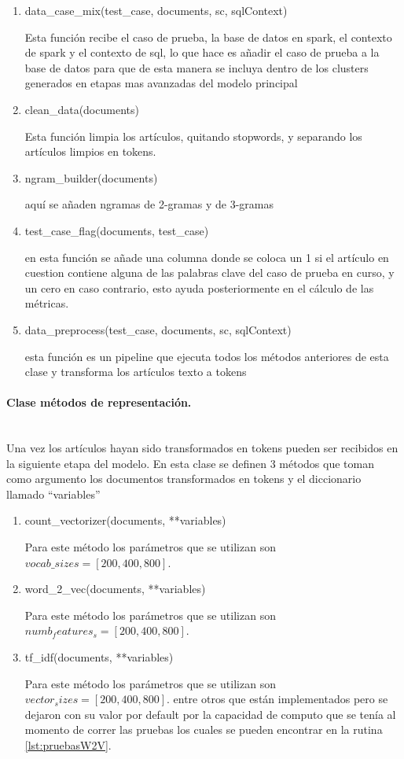 \documentclass[12pt]{article}
\newcommand{\subsubsubsection}[1]{\paragraph{#1}\mbox{}\\}
\begin{document}
			\begin{enumerate}
				\item data\_case\_mix(test\_case, documents, sc, sqlContext)
				 
				Esta función recibe el caso de prueba, la base de datos en spark, el contexto de spark y el contexto de sql, lo que hace es añadir el caso de prueba a la base de datos para que de esta manera se incluya dentro de los clusters generados en etapas mas avanzadas del modelo principal
				
				\item clean\_data(documents)
				
				Esta función limpia los artículos, quitando stopwords, y separando los artículos limpios en tokens.
				
				\item ngram\_builder(documents)
				
				aquí se añaden ngramas de 2-gramas y de 3-gramas
				
				\item test\_case\_flag(documents, test\_case)
				
				en esta función se añade una columna donde se coloca un 1 si el artículo en cuestion contiene alguna de las palabras clave del caso de prueba en curso, y un cero en caso contrario, esto ayuda posteriormente en el cálculo de las métricas.
				
				\item data\_preprocess(test\_case, documents, sc, sqlContext)
				
				esta función es un pipeline que ejecuta todos los métodos anteriores de esta clase y transforma los artículos texto a tokens
			\end{enumerate}
					
				
			\subsubsubsection{Clase métodos de representación.}
			Una vez los artículos hayan sido transformados en tokens pueden ser recibidos en la siguiente etapa del modelo.
			En esta clase se definen 3 métodos que toman como argumento los documentos transformados en tokens y el diccionario llamado ``variables'' 

			\begin{enumerate}
				\item count\_vectorizer(documents, **variables)
				
				Para este método los parámetros que se utilizan son $vocab\_sizes = [200,400,800]$.
				
				\item word\_2\_vec(documents, **variables)
				
				Para este método los parámetros que se utilizan son $numb_features_s  = [200,400,800]$.
				
				\item tf\_idf(documents, **variables)
				
				Para este método los parámetros que se utilizan son $vector_sizes = [200,400,800]$.
				entre otros que están implementados pero se dejaron con su valor por default por la capacidad de computo que se tenía al momento de correr las pruebas los cuales se pueden encontrar en la rutina \ref{lst:pruebasW2V}.
				
			\end{enumerate}			
			
\end{document}
